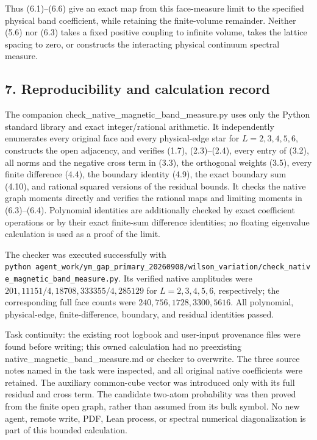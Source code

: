 \documentclass[
  11pt,
]{article}
\begin{document}
Thus (6.1)--(6.6) give an exact map from this face-measure limit to the
specified physical band coefficient, while retaining the finite-volume
remainder. Neither (5.6) nor (6.3) takes a fixed positive coupling to
infinite volume, takes the lattice spacing to zero, or constructs the
interacting physical continuum spectral measure.

\subsection{7. Reproducibility and calculation
record}\label{magnetic-part-8-reproducibility-and-calculation-record}

The companion check\_native\_magnetic\_band\_measure.py uses only the
Python standard library and exact integer/rational arithmetic. It
independently enumerates every original face and every physical-edge
star for \(L=2,3,4,5,6\), constructs the open adjacency, and verifies
(1.7), (2.3)--(2.4), every entry of (3.2), all norms and the negative
cross term in (3.3), the orthogonal weights (3.5), every finite
difference (4.4), the boundary identity (4.9), the exact boundary sum
(4.10), and rational squared versions of the residual bounds. It checks
the native graph moments directly and verifies the rational maps and
limiting moments in (6.3)--(6.4). Polynomial identities are additionally
checked by exact coefficient operations or by their exact finite-sum
difference identities; no floating eigenvalue calculation is used as a
proof of the limit.

The checker was executed successfully with
\texttt{python\ agent\_work/ym\_gap\_primary\_20260908/wilson\_variation/check\_native\_magnetic\_band\_measure.py}.
Its verified native amplitudes were
\(201,11151/4,18708,333355/4,285129\) for \(L=2,3,4,5,6\), respectively;
the corresponding full face counts were \(240,756,1728,3300,5616\). All
polynomial, physical-edge, finite-difference, boundary, and residual
identities passed.

Task continuity: the existing root logbook and user-input provenance
files were found before writing; this owned calculation had no
preexisting native\_magnetic\_band\_measure.md or checker to overwrite.
The three source notes named in the task were inspected, and all
original native coefficients were retained. The auxiliary common-cube
vector was introduced only with its full residual and cross term. The
candidate two-atom probability was then proved from the finite open
graph, rather than assumed from its bulk symbol. No new agent, remote
write, PDF, Lean process, or spectral numerical diagonalization is part
of this bounded calculation.
\end{document}
